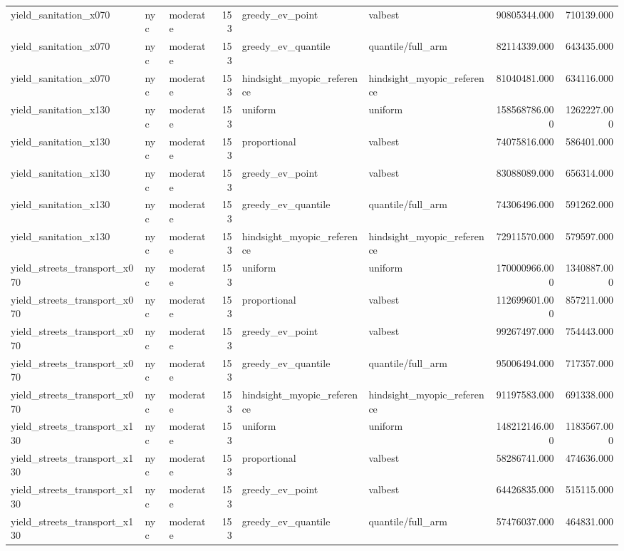 \begin{tabular}{lllrllrr}
yield\_sanitation\_x070 & nyc & moderate & 153 & greedy\_ev\_point & valbest & 90805344.000 & 710139.000 \\
yield\_sanitation\_x070 & nyc & moderate & 153 & greedy\_ev\_quantile & quantile/full\_arm & 82114339.000 & 643435.000 \\
yield\_sanitation\_x070 & nyc & moderate & 153 & hindsight\_myopic\_reference & hindsight\_myopic\_reference & 81040481.000 & 634116.000 \\
yield\_sanitation\_x130 & nyc & moderate & 153 & uniform & uniform & 158568786.000 & 1262227.000 \\
yield\_sanitation\_x130 & nyc & moderate & 153 & proportional & valbest & 74075816.000 & 586401.000 \\
yield\_sanitation\_x130 & nyc & moderate & 153 & greedy\_ev\_point & valbest & 83088089.000 & 656314.000 \\
yield\_sanitation\_x130 & nyc & moderate & 153 & greedy\_ev\_quantile & quantile/full\_arm & 74306496.000 & 591262.000 \\
yield\_sanitation\_x130 & nyc & moderate & 153 & hindsight\_myopic\_reference & hindsight\_myopic\_reference & 72911570.000 & 579597.000 \\
yield\_streets\_transport\_x070 & nyc & moderate & 153 & uniform & uniform & 170000966.000 & 1340887.000 \\
yield\_streets\_transport\_x070 & nyc & moderate & 153 & proportional & valbest & 112699601.000 & 857211.000 \\
yield\_streets\_transport\_x070 & nyc & moderate & 153 & greedy\_ev\_point & valbest & 99267497.000 & 754443.000 \\
yield\_streets\_transport\_x070 & nyc & moderate & 153 & greedy\_ev\_quantile & quantile/full\_arm & 95006494.000 & 717357.000 \\
yield\_streets\_transport\_x070 & nyc & moderate & 153 & hindsight\_myopic\_reference & hindsight\_myopic\_reference & 91197583.000 & 691338.000 \\
yield\_streets\_transport\_x130 & nyc & moderate & 153 & uniform & uniform & 148212146.000 & 1183567.000 \\
yield\_streets\_transport\_x130 & nyc & moderate & 153 & proportional & valbest & 58286741.000 & 474636.000 \\
yield\_streets\_transport\_x130 & nyc & moderate & 153 & greedy\_ev\_point & valbest & 64426835.000 & 515115.000 \\
yield\_streets\_transport\_x130 & nyc & moderate & 153 & greedy\_ev\_quantile & quantile/full\_arm & 57476037.000 & 464831.000 \\

\end{tabular}
